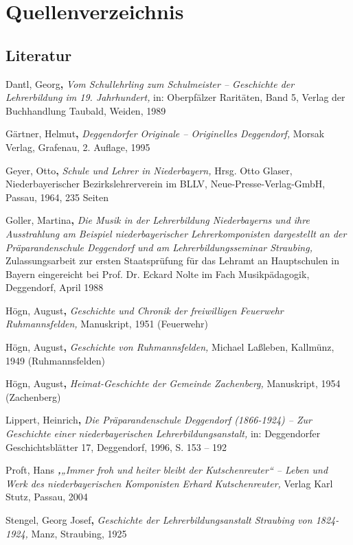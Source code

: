 \documentclass{book}
\begin{document}
\section{Quellenverzeichnis}

\subsection{Literatur}

Dantl, Georg\textbf{,} \textit{Vom Schullehrling zum Schulmeister –
Geschichte der Lehrerbildung im 19. Jahrhundert,} in: Oberpfälzer
Raritäten, Band 5, Verlag der Buchhandlung Taubald, Weiden, 1989

Gärtner, Helmut\textbf{,} \textit{Deggendorfer Originale – Originelles
Deggendorf,} Morsak Verlag, Grafenau, 2. Auflage, 1995

Geyer, Otto\textbf{,} \textit{Schule und Lehrer in Niederbayern,} Hrsg.
Otto Glaser, Niederbayerischer Bezirkslehrerverein im BLLV,
Neue-Presse-Verlag-GmbH, Passau, 1964, 235 Seiten

Goller, Martina\textbf{,} \textit{Die Musik in der Lehrerbildung
Niederbayerns und ihre Ausstrahlung am Beispiel niederbayerischer
Lehrerkomponisten dargestellt an der Präparandenschule Deggendorf und
am Lehrerbildungsseminar Straubing,} Zulassungsarbeit zur ersten
Staatsprüfung für das Lehramt an Hauptschulen in Bayern eingereicht
bei Prof. Dr. Eckard Nolte im Fach Musikpädagogik, Deggendorf, April
1988

Högn, August\textbf{,} \textit{Geschichte und Chronik der freiwilligen
Feuerwehr Ruhmannsfelden,} Manuskript, 1951 (Feuerwehr)

Högn, August\textbf{,} \textit{Geschichte von Ruhmannsfelden,} Michael
Laßleben, Kallmünz, 1949 (Ruhmannsfelden)

Högn, August\textbf{,} \textit{Heimat-Geschichte der Gemeinde
Zachenberg,} Manuskript, 1954 (Zachenberg)

Lippert, Heinrich\textbf{,} \textit{Die Präparandenschule Deggendorf
(1866-1924) – Zur Geschichte einer niederbayerischen
Lehrerbildungsanstalt,} in: Deggendorfer Geschichtsblätter 17,
Deggendorf, 1996, S. 153 – 192

Proft, Hans \textbf{\textit{,}}\textit{„Immer froh und heiter bleibt der
Kutschenreuter“ – Leben und Werk des niederbayerischen Komponisten
Erhard Kutschenreuter,} Verlag Karl Stutz, Passau, 2004

Stengel, Georg Josef\textbf{,} \textit{Geschichte der
Lehrerbildungsanstalt Straubing von 1824-1924,} Manz, Straubing, 1925
\end{document}

